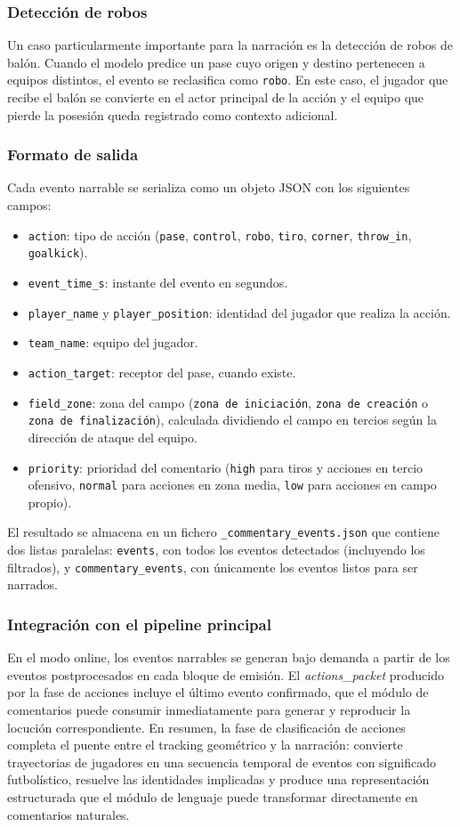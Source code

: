 \subsubsection{Detección de robos}
Un caso particularmente importante para la narración es la detección de robos de balón. Cuando el modelo predice un pase cuyo origen y destino pertenecen a equipos distintos, el evento se reclasifica como \texttt{robo}. En este caso, el jugador que recibe el balón se convierte en el actor principal de la acción y el equipo que pierde la posesión queda registrado como contexto adicional.
\subsubsection{Formato de salida}
Cada evento narrable se serializa como un objeto JSON con los siguientes campos:
\begin{itemize}
    \item \texttt{action}: tipo de acción (\texttt{pase}, \texttt{control}, \texttt{robo}, \texttt{tiro}, \texttt{corner}, \texttt{throw\_in}, \texttt{goalkick}).
    \item \texttt{event\_time\_s}: instante del evento en segundos.
    \item \texttt{player\_name} y \texttt{player\_position}: identidad del jugador que realiza la acción.
    \item \texttt{team\_name}: equipo del jugador.
    \item \texttt{action\_target}: receptor del pase, cuando existe.
    \item \texttt{field\_zone}: zona del campo (\texttt{zona de iniciación}, \texttt{zona de creación} o \texttt{zona de finalización}), calculada dividiendo el campo en tercios según la dirección de ataque del equipo.
    \item \texttt{priority}: prioridad del comentario (\texttt{high} para tiros y acciones en tercio ofensivo, \texttt{normal} para acciones en zona media, \texttt{low} para acciones en campo propio).
\end{itemize}
El resultado se almacena en un fichero \texttt{\_commentary\_events.json} que contiene dos listas paralelas: \texttt{events}, con todos los eventos detectados (incluyendo los filtrados), y \texttt{commentary\_events}, con únicamente los eventos listos para ser narrados.
\subsubsection{Integración con el pipeline principal}
En el modo online, los eventos narrables se generan bajo demanda a partir de los eventos postprocesados en cada bloque de emisión. El \textit{actions\_packet} producido por la fase de acciones incluye el último evento confirmado, que el módulo de comentarios puede consumir inmediatamente para generar y reproducir la locución correspondiente.
En resumen, la fase de clasificación de acciones completa el puente entre el tracking geométrico y la narración: convierte trayectorias de jugadores en una secuencia temporal de eventos con significado futbolístico, resuelve las identidades implicadas y produce una representación estructurada que el módulo de lenguaje puede transformar directamente en comentarios naturales.

